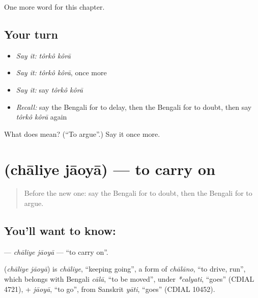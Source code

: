 \begin{grammarlens}[title={What you've built}]
One more word for this chapter.
\end{grammarlens}

\subsection*{Your turn}
\begin{itemize}
\raggedright
  \item \emph{Say it:} \emph{tôrkô kôrā}
  \item \emph{Say it:} \emph{tôrkô kôrā}, once more
  \item \emph{Say it:} say \emph{tôrkô kôrā}
  \item \emph{Recall:} say the Bengali for to delay, then the Bengali for to doubt, then say \emph{tôrkô kôrā} again
\end{itemize}

\begin{tcolorbox}[breakable,colback=teal!4,colframe=teal!35!black,title={Before you move on}]
What does   mean? (\textquotedblleft{}To argue\textquotedblright{}.) Say it once more.
\end{tcolorbox}
\section[\texorpdfstring{\bn{চালিয়ে} \bn{যাওয়া} (chāliye jāoyā)}{চালিয়ে যাওয়া (chāliye jāoyā)}]{  (chāliye jāoyā) — to carry on}

\label{lesson:BN-C150-chaliye-jaoya}



\begin{quote}
Before the new one: say the Bengali for to doubt, then the Bengali for to argue.
\end{quote}

\subsection*{You'll want to know:  }
\textbf{ } — \emph{chāliye jāoyā} — \textquotedblleft{}to carry on\textquotedblright{}.

\begin{cousinweb}
\textbf{ } (\emph{chāliye jāoyā}) is \emph{chāliye}, \textquotedblleft{}keeping going\textquotedblright{}, a form of \emph{chālāno}, \textquotedblleft{}to drive, run\textquotedblright{}, which belongs with Bengali \emph{cālā}, \textquotedblleft{}to be moved\textquotedblright{}, under \emph{*calyati}, \textquotedblleft{}goes\textquotedblright{} (CDIAL 4721), + \emph{jāoyā}, \textquotedblleft{}to go\textquotedblright{}, from Sanskrit \emph{yāti}, \textquotedblleft{}goes\textquotedblright{} (CDIAL 10452).
\end{cousinweb}

